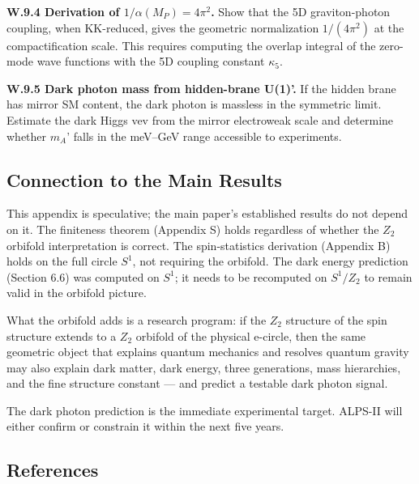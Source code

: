 \documentclass[aps,prd,preprint,superscriptaddress,longbibliography,floatfix]{revtex4-2}
\theoremstyle{remark}
\begin{document}
\textbf{W.9.4 Derivation of $1/\alpha(M_P) = 4\pi^{2}$.} Show that the 5D graviton-photon coupling, when KK-reduced, gives the geometric normalization $1/(4\pi^{2})$ at the compactification scale. This requires computing the overlap integral of the zero-mode wave functions with the 5D coupling constant $\kappa_{5}$.

\textbf{W.9.5 Dark photon mass from hidden-brane U(1)'.} If the hidden brane has mirror SM content, the dark photon is massless in the symmetric limit. Estimate the dark Higgs vev from the mirror electroweak scale and determine whether $m_A$' falls in the meV--GeV range accessible to experiments.



\subsection{Connection to the Main Results}

This appendix is speculative; the main paper's established results do not depend on it. The finiteness theorem (Appendix S) holds regardless of whether the $Z_{2}$ orbifold interpretation is correct. The spin-statistics derivation (Appendix B) holds on the full circle $S^{1}$, not requiring the orbifold. The dark energy prediction (Section 6.6) was computed on $S^{1}$; it needs to be recomputed on $S^{1}/Z_{2}$ to remain valid in the orbifold picture.

What the orbifold adds is a research program: if the $Z_{2}$ structure of the spin structure extends to a $Z_{2}$ orbifold of the physical e-circle, then the same geometric object that explains quantum mechanics and resolves quantum gravity may also explain dark matter, dark energy, three generations, mass hierarchies, and the fine structure constant --- and predict a testable dark photon signal.

The dark photon prediction is the immediate experimental target. ALPS-II will either confirm or constrain it within the next five years.



\subsection{References}
\end{document}
